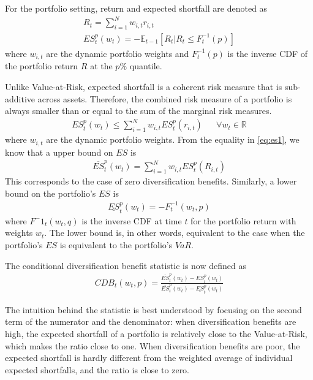 For the portfolio setting, return and expected shortfall are denoted as
\begin{align}
    R_{t} = \sum\limits^N_{i=1} w_{i,t} r_{i,t} \\
    ES^p_t(w_t) = -\mathbb{E}_{t-1}[R_{t} | R_{t} \leq F_{t}^{-1}(p)]
\end{align}
where $w_{i,t}$ are the dynamic portfolio weights and $F_{t}^{-1}(p)$ is the inverse CDF of the portfolio return $R$ at the $p\%$ quantile.

Unlike Value-at-Risk, expected shortfall is a coherent risk measure that is sub-additive across assets. Therefore, the combined risk measure of a portfolio is always smaller than or equal to the sum of the marginal risk measures.
\begin{align} \label{eq:es1}
    ES^p_t(w_t) \leq \sum\limits^N_{i=1} w_{i,t} ES^p_t(r_{i,t}) && \forall w_t \in \mathbb{R}
\end{align}
where $w_{i,t}$ are the dynamic portfolio weights. From the equality in \autoref{eq:es1}, we know that a upper bound on $ES$ is
\begin{align}
    \overline{ES}^p_t(w_t) = \sum\limits^N_{i=1} w_{i,t} ES^p_t(R_{i,t})
\end{align}
This corresponds to the case of zero diversification benefits. Similarly, a lower bound on the portfolio's $ES$ is
\begin{align}
    \underline{ES}^p_t(w_t) = -F^{-1}_t(w_t, p) 
\end{align}
where $F^-1_t(w_t, q)$ is the inverse CDF at time $t$ for the portfolio return with weights $w_t$. The lower bound is, in other words, equivalent to the case when the portfolio's $ES$ is equivalent to the portfolio's $VaR$.

The conditional diversification benefit statistic is now defined as
\begin{align}
    CDB_t(w_t,p) = \frac{\overline{ES}^p_t(w_t) - ES^p_t(w_t)}{\overline{ES}^p_t(w_t) - \underline{ES}^p_t(w_t)}
\end{align}

The intuition behind the statistic is best understood by focusing on the second term of the numerator and the denominator: when diversification benefits are high, the expected shortfall of a portfolio is relatively close to the Value-at-Risk, which makes the ratio close to one. When diversification benefits are poor, the expected shortfall is hardly different from the weighted average of individual expected shortfalls, and the ratio is close to zero.

